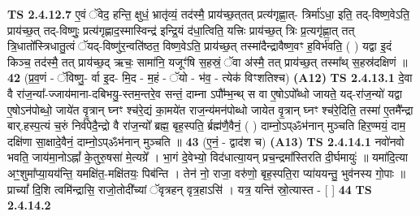\documentclass[17pt]{extarticle}
\begin{document}
                  \newline
                                \textbf{ TS 2.4.12.7} \newline
                  ए॒वं ॅवेद॒ हन्ति॒ क्षुधं॒ भ्रातृ॑व्यं॒ तद॑स्मै॒ प्राय॑च्छ॒त्‌तत् प्रत्य॑गृह्णा॒त्-  त्रिर्मा॑ऽधा॒ इति॒ तद्-विष्ण॒वेऽति॒ प्राय॑च्छ॒त् तद्-विष्णुः॒ प्रत्य॑गृह्णाद॒स्मास्विन्द्र॑ इन्द्रि॒यं द॑धा॒त्विति॒ यत्त्रिः प्राय॑च्छ॒त् त्रिः प्र॒त्यगृ॑ह्णा॒त् तत् त्रि॒धातो᳚स्त्रिधातु॒त्वं ॅयद्-विष्णु॑र॒न्वति॑ष्ठत॒ विष्ण॒वेऽति॒ प्राय॑च्छ॒त् तस्मा॑दैन्द्रावैष्ण॒वꣳ ह॒विर्भ॑वति॒ ( ) यद्वा इ॒दं किञ्च॒ तद॑स्मै॒ तत् प्राय॑च्छ॒द् ऋचः॒ सामा॑नि॒ यजूꣳ॑षि स॒हस्रं॒ ॅवा अ॑स्मै॒ तत् प्राय॑च्छ॒त् तस्मा᳚थ् स॒हस्र॑दक्षिणं ॥ \textbf{  42} \newline
                  \newline
                      (प्र॒व॒णं - ॅविष्णु॒- र्वा इ॒द- मि॒द - म॒हं - ॅयो - भ॑व॒ - त्येक॑ विꣳशतिश्च)  \textbf{(A12)} \newline \newline
                                        \textbf{ TS 2.4.13.1} \newline
                  दे॒वा वै रा॑ज॒न्या᳚-ज्जाय॑माना-दबिभयु॒-स्तम॒न्तरे॒व सन्तं॒ दाम्ना ऽपौ᳚म्भ॒न्थ् स वा ए॒षोऽपो᳚ब्धो जायते॒ यद्-रा॑ज॒न्यो॑ यद्वा ए॒षोऽन॑पोब्धो॒ जाये॑त वृ॒त्रान् घ्नꣳ श्च॑रे॒द्यं का॒मये॑त राज॒न्य॑मन॑पोब्धो जायेत वृ॒त्रान् घ्नꣳ श्च॑रे॒दिति॒ तस्मा॑ ए॒तमै᳚न्द्रा बार्.हस्प॒त्यं च॒रुं निर्व॑पेदै॒न्द्रो वै रा॑ज॒न्यो᳚ ब्रह्म॒ बृह॒स्पति॒ र्ब्रह्म॑णै॒वैनं॒ ( ) दाम्नो॒ऽप्ॐभ॑नान् मुञ्चति हिर॒ण्मयं॒ दाम॒ दक्षि॑णा सा॒क्षादे॒वैनं॒ दाम्नो॒ऽप्ॐभ॑नान् मुञ्चति ॥ \textbf{  43} \newline
                  \newline
                      (ए॒नं॒ - द्वाद॑श च)  \textbf{(A13)} \newline \newline
                                        \textbf{ TS 2.4.14.1} \newline
                  नवो॑नवो भवति॒ जाय॑मा॒नोऽह्नां᳚ के॒तुरु॒षसा॑ मे॒त्यग्रे᳚ । भा॒गं दे॒वेभ्यो॒ विद॑धात्या॒यन् प्रच॒न्द्रमा᳚स्तिरति दी॒र्घमायुः॑ ॥ यमा॑दि॒त्या अꣳ॒॒शुमा᳚प्या॒यय॑न्ति॒ यमक्षि॑त॒-मक्षि॑तयः॒ पिब॑न्ति । तेन॑ नो॒ राजा॒ वरु॑णो॒ बृह॒स्पति॒रा प्या॑ययन्तु॒ भुव॑नस्य गो॒पाः ॥प्राच्यां᳚ दि॒शि त्वमि॑न्द्रासि॒ राजो॒तोदी᳚च्यां ॅवृत्रहन् वृत्र॒हाऽसि॑ । यत्र॒ यन्ति॑ स्रो॒त्यास्त - [  ] \textbf{  44} \newline
                  \newline
                                \textbf{ TS 2.4.14.2} \newline
\end{document}
